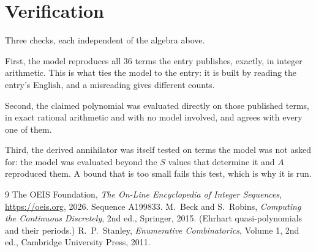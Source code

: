 \documentclass[11pt,a4paper]{article}
\theoremstyle{plain}
\theoremstyle{definition}
\begin{document}
\section{Verification}

Three checks, each independent of the algebra above.

First, the model reproduces all $36$ terms the entry publishes, exactly, in integer
arithmetic. This is what ties the model to the entry: it is built by reading the entry's
English, and a misreading gives different counts.

Second, the claimed polynomial was evaluated directly on those published terms, in exact
rational arithmetic and with no model involved, and agrees with every one of them.

Third, the derived annihilator was itself tested on terms the model was not asked for: the
model was evaluated beyond the $S$ values that determine it and $A$ reproduced them. A bound
that is too small fails this test, which is why it is run.

\begin{thebibliography}{9}
 The OEIS Foundation, \emph{The On-Line Encyclopedia of Integer
Sequences}, \url{https://oeis.org}, 2026. Sequence A199833.
 M.~Beck and S.~Robins, \emph{Computing the Continuous Discretely},
2nd ed., Springer, 2015. (Ehrhart quasi-polynomials and their periods.)
 R.~P.~Stanley, \emph{Enumerative Combinatorics}, Volume 1, 2nd ed.,
Cambridge University Press, 2011.
\end{thebibliography}
\end{document}
